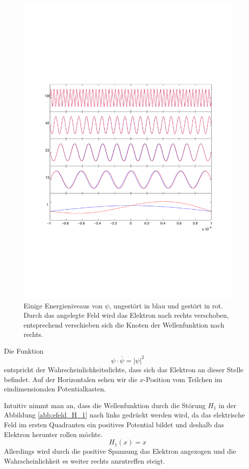 \begin{refsection}
\begin{figure}
 \centering
 \includegraphics[width=12cm,clip=true,trim=2cm 6.6cm 1cm 8cm]{efeld/Psi_SubPlots_gestoert.pdf}
 \caption{Einige Energieniveaus von $\psi$, ungest\"ort in blau und gest\"ort in rot. 
   Durch das angelegte Feld wird das Elektron nach rechts verschoben, entsprechend verschieben sich die Knoten der Wellenfunktion nach rechts.}
 \label{abb:efeld_psi_gestoert}
\end{figure}

Die Funktion 
\[
  \psi \cdot \overline{\psi} = |\psi|^2
\]
entspricht der Wahrscheinlichkeitsdichte, 
dass sich das Elektron an dieser Stelle befindet.
Auf der Horizontalen sehen wir die $x$-Position vom Teilchen im eindimensionalen Potentialkasten.

Intuitiv nimmt man an, dass die Wellenfunktion durch die St\"orung $H_1$ in der Abbildung 
\ref{abb:efeld_H_1} nach links gedr\"uckt werden wird, da das elektrische Feld 
im ersten Quadranten ein positives Potential bildet und deshalb das Elektron herunter rollen m\"ochte.
\[
  H_1(x) = x
\]
Allerdings wird durch die positive Spannung das Elektron angezogen und die
Wahrscheinlichkeit es weiter rechts anzutreffen steigt.


\end{refsection}
